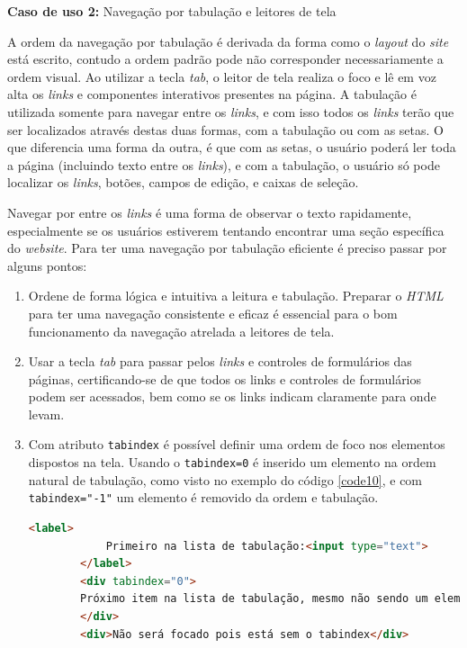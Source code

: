 {{{\textbf{Caso de uso 2:}  Navegação por tabulação e leitores de tela}

A ordem da navegação por tabulação é derivada da forma como o \textit{layout} do \textit{site} está escrito, contudo a ordem padrão pode não corresponder necessariamente a ordem visual. Ao utilizar a tecla \textit{tab}, o leitor de tela realiza o foco e lê em voz alta os \textit{links} e componentes interativos presentes na página.  A tabulação é utilizada somente para navegar entre os \textit{links}, e com isso todos os \textit{links} terão que ser localizados através destas duas formas, com a tabulação ou com as setas. O que diferencia uma forma da outra, é que com as setas, o usuário poderá ler toda a página (incluindo texto entre os \textit{links}), e com a tabulação, o usuário só pode localizar os \textit{links}, botões, campos de edição, e caixas de seleção.

Navegar por entre os \textit{links} é uma forma de observar o texto rapidamente, especialmente se os usuários estiverem tentando encontrar uma seção específica do \textit{website}. Para ter uma navegação por tabulação eficiente é preciso passar por alguns pontos: 

\begin{enumerate}
    \item Ordene de forma lógica e intuitiva a leitura e tabulação. Preparar o \textit{HTML}  para ter uma navegação consistente e eficaz é essencial para o bom funcionamento da navegação atrelada a leitores de tela. 
    \item Usar a tecla \textit{tab} para passar pelos \textit{links} e controles de formulários
    das páginas, certificando-se de que todos os links e controles de formulários podem ser acessados, bem como se os links indicam claramente para onde levam. 
    
    \item Com atributo \lstinline{tabindex} é possível definir uma ordem de foco nos elementos dispostos na tela. Usando o \lstinline{tabindex=0} é inserido um elemento na ordem natural de tabulação, como visto no exemplo do código \ref{code10}, e com \lstinline{tabindex="-1"} um elemento é removido da ordem e tabulação.
    {\begin{lstlisting}[language=html,caption={Uso do atributo \textit{tabindex} para adicionar um elemento a ordem de foco}, label=code10]
        <label>
            Primeiro na lista de tabulação:<input type="text">
        </label>
        <div tabindex="0">
        Próximo item na lista de tabulação, mesmo não sendo um elemento que receberia o foco natural
        </div>
        <div>Não será focado pois está sem o tabindex</div>
    \end{lstlisting}}
    

\end{enumerate}}}
